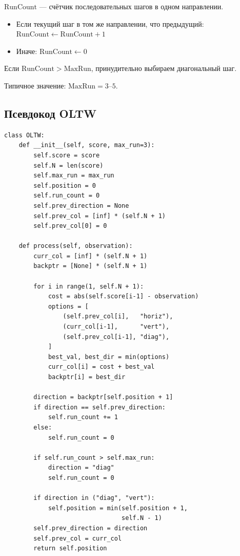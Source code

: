 \documentclass[a4paper,11pt]{article}
\begin{document}
\begin{formulabox}[title={RunCount}]
$\mathrm{RunCount}$ --- счётчик последовательных шагов в одном направлении.
\begin{itemize}[leftmargin=1.5em]
  \item Если текущий шаг в том же направлении, что предыдущий:
        $\mathrm{RunCount} \gets \mathrm{RunCount} + 1$
  \item Иначе: $\mathrm{RunCount} \gets 0$
\end{itemize}
Если $\mathrm{RunCount} > \mathrm{MaxRun}$, принудительно выбираем
диагональный шаг.

Типичное значение: $\mathrm{MaxRun} = 3\text{--}5$.
\end{formulabox}

\subsection{Псевдокод OLTW}

\begin{algbox}[title={Алгоритм OLTW}]
\begin{lstlisting}[style=python, numbers=none]
class OLTW:
    def __init__(self, score, max_run=3):
        self.score = score
        self.N = len(score)
        self.max_run = max_run
        self.position = 0
        self.run_count = 0
        self.prev_direction = None
        self.prev_col = [inf] * (self.N + 1)
        self.prev_col[0] = 0

    def process(self, observation):
        curr_col = [inf] * (self.N + 1)
        backptr = [None] * (self.N + 1)

        for i in range(1, self.N + 1):
            cost = abs(self.score[i-1] - observation)
            options = [
                (self.prev_col[i],   "horiz"),
                (curr_col[i-1],      "vert"),
                (self.prev_col[i-1], "diag"),
            ]
            best_val, best_dir = min(options)
            curr_col[i] = cost + best_val
            backptr[i] = best_dir

        direction = backptr[self.position + 1]
        if direction == self.prev_direction:
            self.run_count += 1
        else:
            self.run_count = 0

        if self.run_count > self.max_run:
            direction = "diag"
            self.run_count = 0

        if direction in ("diag", "vert"):
            self.position = min(self.position + 1,
                                self.N - 1)
        self.prev_direction = direction
        self.prev_col = curr_col
        return self.position
\end{lstlisting}
\end{algbox}
\end{document}
